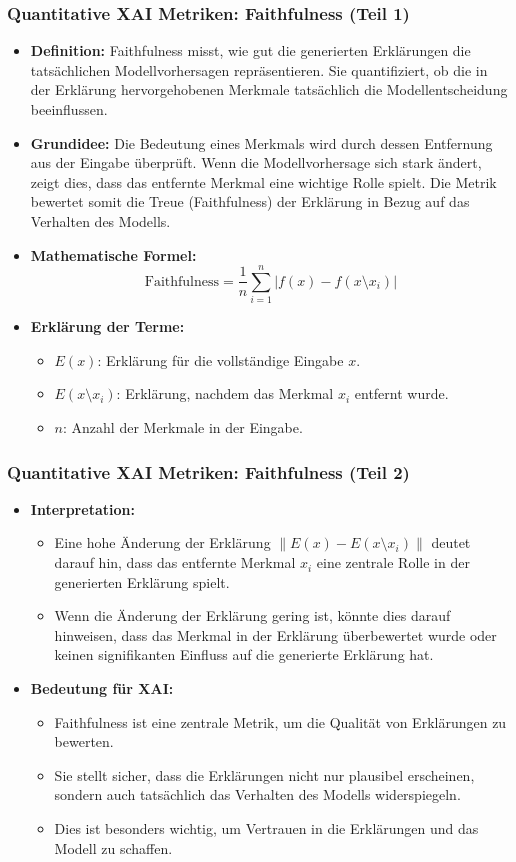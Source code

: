 \documentclass[aspectratio=1610, xcolor=dvipsnames, 9pt]{beamer}
\begin{document}
\begin{frame}
  \frametitle{Quantitative XAI Metriken: Faithfulness (Teil 1)}
  \begin{itemize}
    \item \textbf{Definition:} Faithfulness misst, wie gut die generierten Erklärungen die tatsächlichen Modellvorhersagen repräsentieren. Sie quantifiziert, ob die in der Erklärung hervorgehobenen Merkmale tatsächlich die Modellentscheidung beeinflussen.
    \item \textbf{Grundidee:} Die Bedeutung eines Merkmals wird durch dessen Entfernung aus der Eingabe überprüft. Wenn die Modellvorhersage sich stark ändert, zeigt dies, dass das entfernte Merkmal eine wichtige Rolle spielt. Die Metrik bewertet somit die Treue (Faithfulness) der Erklärung in Bezug auf das Verhalten des Modells.
    \item \textbf{Mathematische Formel:}
    \[
    \text{Faithfulness} = \frac{1}{n} \sum_{i=1}^n \left| f(x) - f(x \setminus x_i) \right|
    \]
    \item \textbf{Erklärung der Terme:}
    \begin{itemize}
      \item $E(x)$: Erklärung für die vollständige Eingabe $x$.
      \item $E(x \setminus x_i)$: Erklärung, nachdem das Merkmal $x_i$ entfernt wurde.
      \item $n$: Anzahl der Merkmale in der Eingabe.
    \end{itemize}
  \end{itemize}
\end{frame}

\begin{frame}
  \frametitle{Quantitative XAI Metriken: Faithfulness (Teil 2)}
  \begin{itemize}
    \item \textbf{Interpretation:} 
    \begin{itemize}
      \item Eine hohe Änderung der Erklärung $\left\| E(x) - E(x \setminus x_i) \right\|$ deutet darauf hin, dass das entfernte Merkmal $x_i$ eine zentrale Rolle in der generierten Erklärung spielt.
      \item Wenn die Änderung der Erklärung gering ist, könnte dies darauf hinweisen, dass das Merkmal in der Erklärung überbewertet wurde oder keinen signifikanten Einfluss auf die generierte Erklärung hat.
    \end{itemize}
    \item \textbf{Bedeutung für XAI:} 
    \begin{itemize}
      \item Faithfulness ist eine zentrale Metrik, um die Qualität von Erklärungen zu bewerten.
      \item Sie stellt sicher, dass die Erklärungen nicht nur plausibel erscheinen, sondern auch tatsächlich das Verhalten des Modells widerspiegeln.
      \item Dies ist besonders wichtig, um Vertrauen in die Erklärungen und das Modell zu schaffen.
    \end{itemize}
  \end{itemize}
\end{frame}
\end{document}
